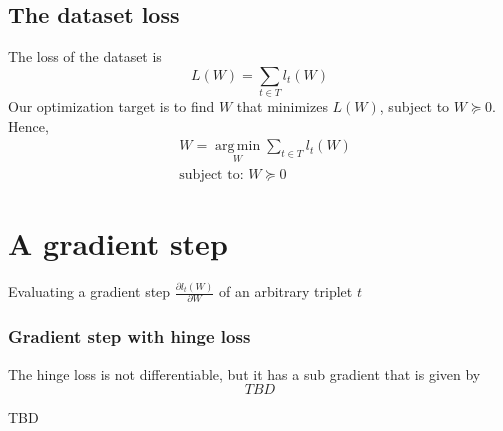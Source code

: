 \documentclass{article}
\DeclareMathOperator*{\argmin}{arg\,min}
\begin{document}
\subsection{The dataset loss} 
The loss of the dataset is
\begin{equation}
L(W)=\sum\limits_{t\in T}{l_t (W)}
\end{equation}
Our optimization target is to find $W$ that minimizes $L(W)$, subject to $W\succeq 0$. Hence,
\begin{equation}
\begin{aligned}
& W=\argmin\limits_{W}{\sum\limits_{t\in T}{l_t (W)}}  \\ & \text{subject to: } W\succeq 0
\end{aligned}
\end{equation}
\section{A gradient step} 
Evaluating a gradient step  $\frac{\partial {l_t (W)}}{\partial W}$ of an arbitrary triplet $t$
\subsubsection{Gradient step with hinge loss} 
The hinge loss is not differentiable, but it has a sub gradient that is given by
\begin{equation}
TBD
\end{equation}

TBD




\end{document}
